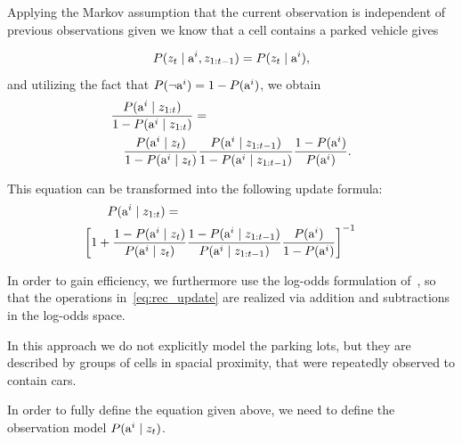 Applying the Markov assumption that the current observation is independent of
previous observations given we know that a cell contains a parked vehicle
gives

\begin{equation}
P(z_{t} \mid {\mbox{a}^i}, z_{1:t-1}) = P(z_{t} \mid {\mbox{a}^i}),
\end{equation}
\noindent
and utilizing the fact that $P(\neg {\mbox{a}^i}) = 1 - P({\mbox{a}^i})$, we obtain
\begin{eqnarray}
\lefteqn{\frac{ P(\v \mid z_{1:t}) }{ 1 - P(\v \mid z_{1:t})} = } \nonumber \\
&&\frac{ P( \v \mid \z)}{ 1 - P(\v \mid \z)}   \frac{ P(\v \mid \y)}{ 1 - P(\v \mid  \y)}   \frac{ 1 - P(\v)}{ P(\v)}.
\end{eqnarray}

\noindent
This equation can be transformed into the following update formula:
\begin{eqnarray}
\label{eq:rec_update}
\hspace{-6mm}\lefteqn{P(\v\mid z_{1:t})=} \nonumber \\
&& \hspace{-10mm} \left[ 1 + \frac{1 - P(\v\mid \z)}{P(\v \mid \z)}
\frac{1 - P(\v \mid \y)}{P(\v \mid \y)}   \frac{P(\v)}{1 - P(\v)}  \right]^{-1}
\end{eqnarray}
\noindent

In order to gain efficiency, we furthermore use the log-odds  formulation of~\citet{occupancy_grids}, so that the
operations in~\eqref{eq:rec_update} are realized via addition and
subtractions in the log-odds space.

In this approach we do not explicitly model the parking lots, but they are
described by groups of cells in spacial proximity, that were repeatedly
observed to contain cars.

In order to fully define the equation given above, we need to define the
observation model $P({\mbox{a}^i} \mid z_t)$.

